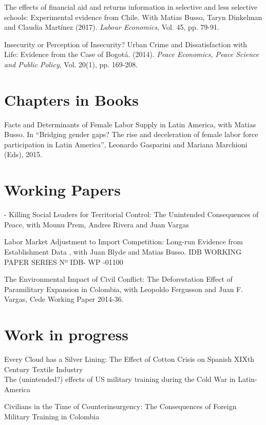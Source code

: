 \documentclass{moderncv}
\begin{document}
{The effects of financial aid and returns information in selective and less selective schools: Experimental evidence from Chile. With Matias Busso, Taryn Dinkelman and Claudia Martínez (2017). \emph{Labour Economics}, Vol. 45, pp. 79-91.\\}

{Insecurity or Perception of Insecurity? Urban Crime and Dissatisfaction with Life: Evidence from the Case of Bogot\'a. (2014). \emph{Peace Economics, Peace Science and Public Policy}, Vol. 20(1), pp. 169-208.}

\section{\textbf{Chapters in Books}}
{Facts and Determinants of Female Labor Supply in Latin America, with Matias Busso. In “Bridging gender gaps? The rise and deceleration of female labor force participation in Latin America”, Leonardo Gasparini and Mariana Marchioni (Eds), 2015.}

\section{\textbf{Working Papers}}
{- Killing Social Leaders for Territorial Control: The Unintended Consequences of Peace, with Mounu Prem, Andres Rivera and Juan Vargas\\}

{Labor Market Adjustment to Import Competition: Long-run Evidence from Establishment Data , with Juan Blyde and Matias Busso. IDB WORKING PAPER SERIES Nº IDB- WP -01100 \\}

{The Environmental Impact of Civil Conflict: The Deforestation Effect of Paramilitary Expansion in Colombia, with Leopoldo Fergusson and Juan F. Vargas, Cede Working Paper 2014-36.}

\section{\textbf{Work in progress}}

{Every Cloud has a Silver Lining: The Effect of Cotton Crisis on Spanish XIXth Century Textile Industry}\\

{The (unintended?) effects of US military training during the Cold War in Latin-America \\}

{Civilians in the Time of Counterinsurgency: The Consequences of Foreign Military Training in Colombia}
\end{document}
